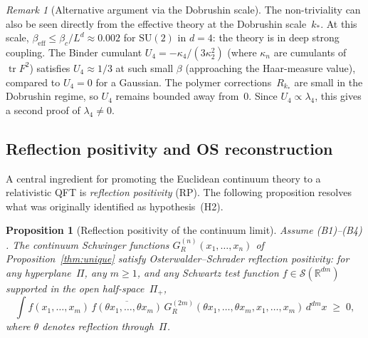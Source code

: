 \documentclass[11pt,a4paper]{article}
\theoremstyle{plain}
\newtheorem{proposition}[theorem]{Proposition}
\theoremstyle{definition}
\theoremstyle{remark}
\newtheorem{remark}[theorem]{Remark}
\newcommand{\R}{\mathbb{R}}
\newcommand{\tr}{\operatorname{tr}}
\newcommand{\SU}{\mathrm{SU}}
\begin{document}
\begin{remark}[Alternative argument via the Dobrushin scale]
\label{rem:dobrushin_nontrivial}
The non-triviality can also be seen directly from the
effective theory at the Dobrushin scale~$k_*$.  At this
scale, $\beta_{\mathrm{eff}} \leq \beta_c/L^d \approx 0.002$
for $\SU(2)$ in $d = 4$: the theory is in deep strong
coupling.  The Binder cumulant
$U_4 = -\kappa_4/(3\kappa_2^2)$
(where $\kappa_n$ are cumulants of $\tr F^2$)
satisfies $U_4 \approx 1/3$ at such small $\beta$
(approaching the Haar-measure value),
compared to $U_4 = 0$ for a Gaussian.
The polymer corrections~$R_{k_*}$ are small in the
Dobrushin regime, so $U_4$ remains bounded away from~$0$.
Since $U_4 \propto \lambda_4$, this gives a second proof
of $\lambda_4 \neq 0$.
\end{remark}

\subsection{Reflection positivity and OS reconstruction}

A central ingredient for promoting the Euclidean continuum
theory to a relativistic QFT is \emph{reflection positivity}
(RP).  The following proposition resolves what was originally
identified as hypothesis~(H2).

\begin{proposition}[Reflection positivity of the continuum
limit]\label{prop:rp}
Assume (B1)--(B4) \cite{FontesSU2}.
The continuum Schwinger functions
$G_R^{(n)}(x_1, \ldots, x_n)$ of
Proposition~\ref{thm:unique} satisfy
Osterwalder--Schrader reflection positivity:
for any hyperplane~$\Pi$, any $m \geq 1$, and any
Schwartz test function $f \in \mathcal{S}(\R^{dm})$
supported in the open half-space~$\Pi_+$,
\begin{equation}\label{eq:rp}
  \int f(x_1,\ldots,x_m)\,\overline{f(\theta x_1,
  \ldots,\theta x_m)}\,
  G_R^{(2m)}(\theta x_1, \ldots, \theta x_m,
  x_1, \ldots, x_m)\,
  d^{dm}x \;\geq\; 0,
\end{equation}
where $\theta$ denotes reflection through~$\Pi$.
\end{proposition}
\end{document}
